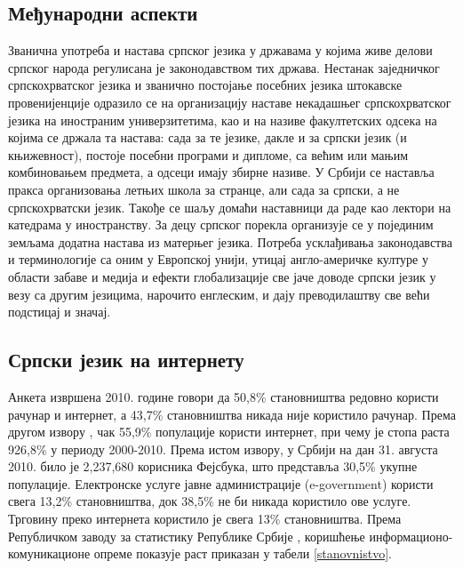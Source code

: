 \begin{multicols}{2}
 \subsection {Међународни аспекти}
   
 
Званична употреба и настава српског језика у државама у којима живе делови српског народа регулисана је законодавством тих држава. 
Нестанак заједничког српскохрватског језика и званично постојање посебних језика штокавске провенијенције одразило се на организацију наставе некадашњег српскохрватског језика на иностраним универзитетима, као и на називе факултетских одсека на којима се држала та настава: сада за те језике, дакле и за српски језик (и књижевност), постоје посебни програми и дипломе, са већим или мањим комбиновањем предмета, а одсеци имају збирне називе.
У Србији се наставља пракса организовања летњих  школа за странце, али сада за српски, а не српскохрватски језик. Такође се шаљу домаћи наставници да раде као лектори на катедрама у иностранству. 
За децу српског порекла организује се у појединим земљама додатна настава из матерњег језика. 
Потреба усклађивања законодавства и терминологије са оним у Европској унији, утицај англо-америчке културе у области забаве и медија и ефекти глобализације све јаче доводе српски језик у везу са другим језицима, нарочито енглеским, и дају преводилаштву све већи  подстицај и значај.

 \subsection {Српски језик на интернету}
   
Анкета \cite{PKEY204} извршена 2010. године говори да 50,8\% становништва редовно користи рачунар и интернет, а 43,7\% становништва никада није користило рачунар. Према другом извору \cite{EUROPA2}, чак 55,9\% популације користи интернет, при чему је стопа раста 926,8\% у периоду 2000-2010. Према истом извору, у Србији на дан 31. августа 2010. било је 2,237,680 корисника Фејсбука, што представља 30,5\% укупне популације. Електронске услуге јавне администрације (e-government) користи  свега 13,2\% становништва, док 38,5\% не би никада користило ове услуге. Трговину преко интернета користило је свега 13\% становништва. Према Републичком заводу за статистику Републике Србије \cite{WEBRZS}, коришћење информационо-комуникационе опреме показује раст приказан у табели \ref{stanovnistvo}.


\end{multicols}
